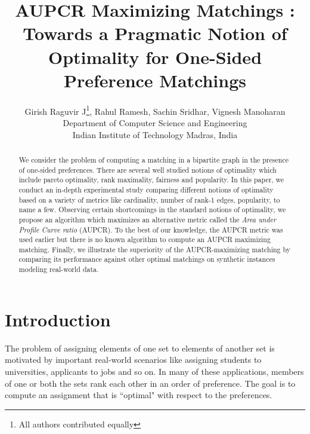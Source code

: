 \documentclass[letterpaper]{article} %
\begin{document}

\title{AUPCR Maximizing Matchings : Towards a Pragmatic Notion of Optimality for One-Sided Preference Matchings} %
\author{ Girish Raguvir J\thanks{All authors contributed equally},  Rahul Ramesh\footnotemark[1],  Sachin Sridhar\footnotemark[1], Vignesh Manoharan\footnotemark[1]\\
Department of Computer Science and Engineering\\
Indian Institute of Technology Madras, India
}
\maketitle
\begin{abstract}
We consider the problem of computing a matching in a bipartite graph in the presence of one-sided preferences.
There are several well studied notions of optimality which include pareto optimality, rank maximality, fairness and popularity. In this paper, we conduct an in-depth experimental study comparing different notions of optimality based on a variety of metrics like cardinality, number of rank-1 edges, popularity, to name a few. Observing certain shortcomings in the standard notions of optimality, we propose an algorithm which maximizes an alternative metric called the \textit{Area under Profile Curve ratio} (AUPCR). To the best of our knowledge, the AUPCR metric was used earlier but there is no known algorithm to compute an AUPCR maximizing matching. Finally, we illustrate the superiority of the AUPCR-maximizing matching by comparing its performance against other optimal matchings on synthetic instances modeling real-world data.
\end{abstract}
\section{Introduction}
The problem of assigning elements of one set to elements of another set is motivated by important real-world scenarios like assigning students to universities, applicants to jobs and so on. In many of these applications, members of one or both the sets rank each other in an order of preference. The goal is to compute an assignment that is ``optimal" with respect to the preferences.
\end{document}
